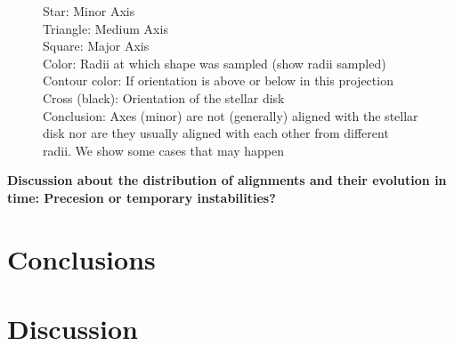 \documentclass[a4paper,fleqn,usenatbib]{mnras}
\begin{document}
\begin{figure}
  \hfill
  \caption{Star: Minor Axis\\
  		   Triangle: Medium Axis\\
  		   Square: Major Axis\\
  		   Color: Radii at which shape was sampled (show radii sampled)\\
  		   Contour color: If orientation is above or below in this projection\\
  		   Cross (black): Orientation of the stellar disk\\
  		   Conclusion: Axes (minor) are not (generally) aligned with the stellar disk nor are they usually aligned with each other from different radii. We show some cases that may happen\\  }
  \label{fig:alignment}
\end{figure}

\textbf{Discussion about the distribution of alignments and their
  evolution in time: Precesion or temporary instabilities?} 

\section{Conclusions}

\section{Discussion}
\end{document}
